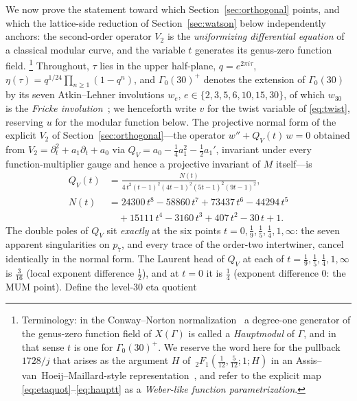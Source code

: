 \documentclass[11pt]{article}
\theoremstyle{plain}
\theoremstyle{remark}
\begin{document}
We now prove the statement toward which Section~\ref{sec:orthogonal} points, and which the lattice-side
reduction of Section~\ref{sec:watson} below independently anchors: the second-order
operator $V_2$ is the \emph{uniformizing differential equation} of a classical modular curve, and the variable
$t$ generates its genus-zero function field.%
\footnote{Terminology: in the Conway--Norton normalization~\cite{ConwayNorton1979} a degree-one generator of
the genus-zero function field of $X(\Gamma)$ is called a \emph{Hauptmodul} of $\Gamma$, and in that sense $t$
is one for $\Gamma_0(30)^+$. We reserve the word here for the pullback $1728/j$ that arises as the argument $H$
of $\,_2F_1\!\left(\tfrac1{12},\tfrac5{12};1;H\right)$ in an
Assis--van~Hoeij--Maillard-style representation~\cite{AVM2016}, and refer to the explicit
map \eqref{eq:etaquot}--\eqref{eq:hauptt} as a \emph{Weber-like function parametrization}.}
Throughout, $\tau$ lies in the upper half-plane, $q=e^{2\pi i\tau}$,
$\eta(\tau)=q^{1/24}\prod_{n\ge1}(1-q^n)$, and $\Gamma_0(30)^+$ denotes the extension of $\Gamma_0(30)$ by its
seven Atkin--Lehner involutions $w_e$, $e\in\{2,3,5,6,10,15,30\}$, of which $w_{30}$ is the \emph{Fricke
involution}~\cite{AtkinLehner1970,ConwayNorton1979}; we
henceforth write $v$ for the twist variable of \eqref{eq:twist}, reserving $u$ for the modular function
below. The projective normal form of the explicit $V_2$ of Section~\ref{sec:orthogonal}---the operator
$w''+Q_V(t)\,w=0$ obtained from $V_2=\partial_t^2+a_1\partial_t+a_0$ via
$Q_V=a_0-\tfrac14a_1^2-\tfrac12a_1'$, invariant under every function-multiplier gauge and hence a projective
invariant of $M$ itself---is
\begin{equation}
\begin{split}
Q_V(t)&=\frac{N(t)}{4\,t^2(t-1)^2(4t-1)^2(5t-1)^2(9t-1)^2},\\[2pt]
N(t)&=24300\,t^8-58860\,t^7+73437\,t^6-44294\,t^5\\
&\quad{}+15111\,t^4-3160\,t^3+407\,t^2-30\,t+1.
\end{split}
\label{eq:QV}
\end{equation}
The double poles of $Q_V$ sit \emph{exactly} at the six points $t=0,\tfrac19,\tfrac15,\tfrac14,1,\infty$: the
seven apparent singularities on $p_7$, and every trace of the order-two intertwiner, cancel identically in the
normal form. The Laurent head of $Q_V$ at each of $t=\tfrac19,\tfrac15,\tfrac14,1,\infty$ is $\tfrac3{16}$
(local exponent difference $\tfrac12$), and at $t=0$ it is $\tfrac14$ (exponent difference $0$: the MUM point).
Define the level-30 eta quotient
\end{document}
